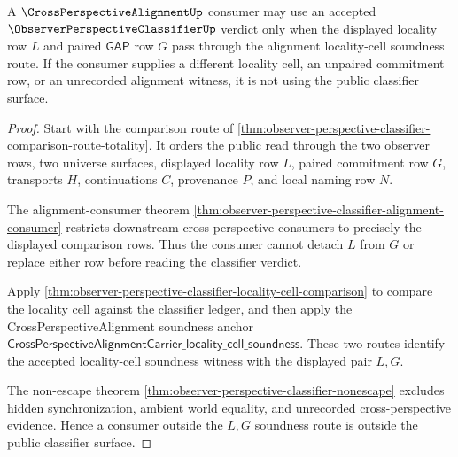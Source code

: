 \begin{theorem}
\label{thm:observer-perspective-classifier-cross-alignment-locality-soundness}
A $\CrossPerspectiveAlignmentUp$ consumer may use an accepted $\ObserverPerspectiveClassifierUp$ verdict only when the displayed locality row $L$ and paired $\mathsf{GAP}$ row $G$ pass through the alignment locality-cell soundness route. If the consumer supplies a different locality cell, an unpaired commitment row, or an unrecorded alignment witness, it is not using the public classifier surface.
\end{theorem}
\begin{proof}
Start with the comparison route of \autoref{thm:observer-perspective-classifier-comparison-route-totality}. It orders the public read through the two observer rows, two universe surfaces, displayed locality row $L$, paired commitment row $G$, transports $H$, continuations $C$, provenance $P$, and local naming row $N$.

The alignment-consumer theorem \autoref{thm:observer-perspective-classifier-alignment-consumer} restricts downstream cross-perspective consumers to precisely the displayed comparison rows. Thus the consumer cannot detach $L$ from $G$ or replace either row before reading the classifier verdict.

Apply \autoref{thm:observer-perspective-classifier-locality-cell-comparison} to compare the locality cell against the classifier ledger, and then apply the CrossPerspectiveAlignment soundness anchor $\mathsf{CrossPerspectiveAlignmentCarrier\_locality\_cell\_soundness}$. These two routes identify the accepted locality-cell soundness witness with the displayed pair $L,G$.

The non-escape theorem \autoref{thm:observer-perspective-classifier-nonescape} excludes hidden synchronization, ambient world equality, and unrecorded cross-perspective evidence. Hence a consumer outside the $L,G$ soundness route is outside the public classifier surface.
\end{proof}

